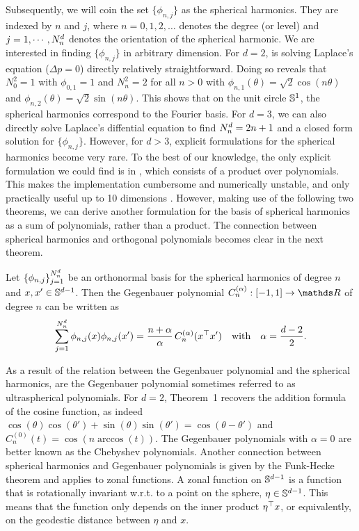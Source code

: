 Subsequently, we will coin the set $\{\phi_{n,j}\}$ as the spherical harmonics. They are indexed by $n$ and $j$, where $n=0,1,2,\ldots$ denotes the degree (or level) and $j=1,\cdots,N^d_n$ denotes the orientation of the spherical harmonic. We are interested in finding $\{\phi_{n,j}\}$ in arbitrary dimension. For $d=2$, is solving Laplace's equation ($\Delta p = 0$) directly relatively straightforward. Doing so reveals that $N^{2}_0 = 1$ with $\phi_{0, 1} = 1$ and $N^{2}_n = 2$ for all $n > 0$ with $\phi_{n, 1}(\theta) = \sqrt{2} \cos(n \theta)$ and $\phi_{n, 2}(\theta) = \sqrt{2} \sin(n \theta)$. This shows that on the unit circle $\mathbb{S}^1$, the spherical harmonics correspond to the Fourier basis. For $d=3$, we can also directly solve Laplace's diffential equation to find $N^d_n = 2n + 1$ and a closed form solution for $\{\phi_{n,j}\}$. However, for $d > 3$, explicit formulations for the spherical harmonics become very rare. To the best of our knowledge, the only explicit formulation we could find is in \citet[Theorem~5.1]{dai2013}, which consists of a product over polynomials. This makes the implementation cumbersome and numerically unstable, and only practically useful up to 10 dimensions \citep{Dutordoir2020spherical}. However, making use of the following two theorems, we can derive another formulation for the basis of spherical harmonics as a sum of polynomials, rather than a product. The connection between spherical harmonics and orthogonal polynomials becomes clear in the next theorem.
\begin{theorem}[Addition]
    \label{theorem:addition}
    Let $\{\phi_{n,j}\}_{j=1}^{N^d_n}$ be an orthonormal basis for the spherical harmonics of degree $n$ and $x,x' \in \mathbb{S}^{d-1}$. Then the Gegenbauer polynomial $C_n^{(\alpha)}: [-1, 1] \rightarrow \Reals$ of degree $n$ can be written as
\begin{equation}
    \sum_{j=1}^{N^d_n} \phi_{n, j}(x) \phi _{n, j}(x') = \frac{n + \alpha}{\alpha}\,
    C_n^{(\alpha)}(x^{\top} x')\quad\text{with}\quad \alpha = \frac{d-2}{2}.
\end{equation}
\end{theorem}
As a result of the relation between the Gegenbauer polynomial and the spherical harmonics, are the Gegenbauer polynomial sometimes referred to as ultraspherical polynomials. For $d=2$, Theorem~1 recovers the addition formula of the cosine function, as indeed $\cos(\theta) \cos(\theta') + \sin(\theta) \sin(\theta') = \cos(\theta - \theta')$ and $C_n^{(0)}(t) = \cos(n \arccos(t))$. The Gegenbauer polynomials with $\alpha=0$ are better known as the Chebyshev polynomials. Another connection between spherical harmonics and Gegenbauer polynomials is given by the Funk-Hecke theorem and applies to zonal functions. A zonal function on $\mathbb{S}^{d-1}$ is a function that is rotationally invariant w.r.t. to a point on the sphere, $\eta \in \mathbb{S}^{d-1}$. This means that the function only depends on the inner product $\eta^{\top} x$, or equivalently, on the geodestic distance between $\eta$ and $x$.


